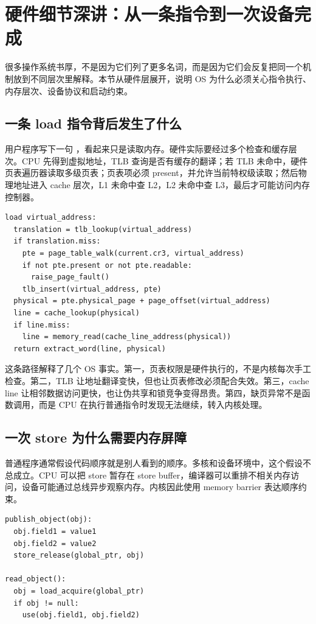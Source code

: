 \section{硬件细节深讲：从一条指令到一次设备完成}

很多操作系统书厚，不是因为它们列了更多名词，而是因为它们会反复把同一个机制放到不同层次里解释。本节从硬件层展开，说明 OS 为什么必须关心指令执行、内存层次、设备协议和启动约束。

\subsection{一条 load 指令背后发生了什么}

用户程序写下一句 ，看起来只是读取内存。硬件实际要经过多个检查和缓存层次。CPU 先得到虚拟地址，TLB 查询是否有缓存的翻译；若 TLB 未命中，硬件页表遍历器读取多级页表；页表项必须 present，并允许当前特权级读取；然后物理地址进入 cache 层次，L1 未命中查 L2，L2 未命中查 L3，最后才可能访问内存控制器。

\begin{lstlisting}
load virtual_address:
  translation = tlb_lookup(virtual_address)
  if translation.miss:
    pte = page_table_walk(current.cr3, virtual_address)
    if not pte.present or not pte.readable:
      raise_page_fault()
    tlb_insert(virtual_address, pte)
  physical = pte.physical_page + page_offset(virtual_address)
  line = cache_lookup(physical)
  if line.miss:
    line = memory_read(cache_line_address(physical))
  return extract_word(line, physical)
\end{lstlisting}

这条路径解释了几个 OS 事实。第一，页表权限是硬件执行的，不是内核每次手工检查。第二，TLB 让地址翻译变快，但也让页表修改必须配合失效。第三，cache line 让相邻数据访问更快，也让伪共享和锁竞争变得昂贵。第四，缺页异常不是函数调用，而是 CPU 在执行普通指令时发现无法继续，转入内核处理。

\subsection{一次 store 为什么需要内存屏障}

普通程序通常假设代码顺序就是别人看到的顺序。多核和设备环境中，这个假设不总成立。CPU 可以把 store 暂存在 store buffer，编译器可以重排不相关内存访问，设备可能通过总线异步观察内存。内核因此使用 memory barrier 表达顺序约束。

\begin{lstlisting}
publish_object(obj):
  obj.field1 = value1
  obj.field2 = value2
  store_release(global_ptr, obj)

read_object():
  obj = load_acquire(global_ptr)
  if obj != null:
    use(obj.field1, obj.field2)
\end{lstlisting}

